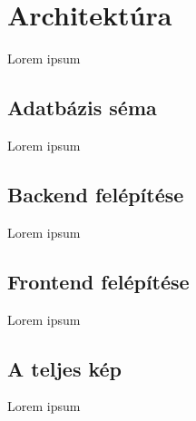 \chapter{Architektúra}

Lorem ipsum

\section{Adatbázis séma}

Lorem ipsum

\section{Backend felépítése}

Lorem ipsum

\section{Frontend felépítése}

Lorem ipsum

\section{A teljes kép}

Lorem ipsum

